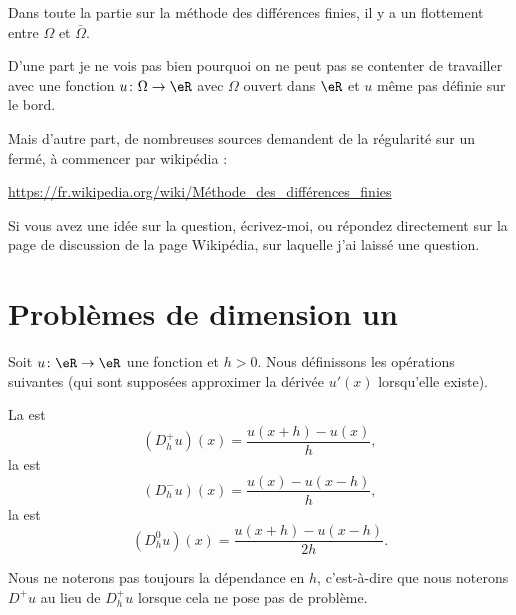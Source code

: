 
\begin{probleme}
    Dans toute la partie sur la méthode des différences finies, il y a un flottement entre \( \Omega\) et \( \bar \Omega\).

    D'une part je ne vois pas bien pourquoi on ne peut pas se contenter de travailler avec une fonction \( u\colon \Omega\to \eR\) avec \( \Omega\) ouvert dans \( \eR\) et \( u\) même pas définie sur le bord.

    Mais d'autre part, de nombreuses sources demandent de la régularité sur un fermé, à commencer par wikipédia :

    \url{https://fr.wikipedia.org/wiki/Méthode_des_différences_finies}

    Si vous avez une idée sur la question, écrivez-moi, ou répondez directement sur la page de discussion de la page Wikipédia, sur laquelle j'ai laissé une question.
\end{probleme}

\section{Problèmes de dimension un}

Soit \( u\colon \eR\to \eR\) une fonction et \( h>0\). Nous définissons les opérations suivantes (qui sont supposées approximer la dérivée \( u'(x)\) lorsqu'elle existe).

\begin{definition}
	La  est
	\begin{equation}
		(D^+_hu)(x)=\frac{ u(x+h)-u(x) }{ h },
	\end{equation}
	la  est
	\begin{equation}
		(D^-_hu)(x)=\frac{ u(x)-u(x-h) }{ h },
	\end{equation}
	la  est
	\begin{equation}
		(D^0_hu)(x)=\frac{ u(x+h)-u(x-h) }{ 2h }.
	\end{equation}
\end{definition}
Nous ne noterons pas toujours la dépendance en \( h\), c'est-à-dire que nous noterons \( D^+u\) au lieu de \( D^+_hu\) lorsque cela ne pose pas de problème.

